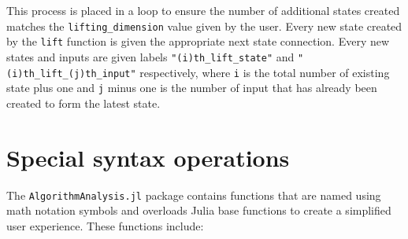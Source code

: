 This process is placed in a loop to ensure the number of additional states created matches the \texttt{lifting\_dimension} value given by the user. Every new state created by the \texttt{lift} function is given the appropriate next state connection. Every new states and inputs are given labels \texttt{"(i)th\_lift\_state"} and \texttt{"(i)th\_lift\_(j)th\_input"} respectively, where \texttt{i} is the total number of existing state plus one and \texttt{j} minus one is the number of input that has already been created to form the latest state.

\section{Special syntax operations}

The \texttt{AlgorithmAnalysis.jl} package contains functions that are named using math notation symbols and overloads Julia base functions to create a simplified user experience. These functions include:
